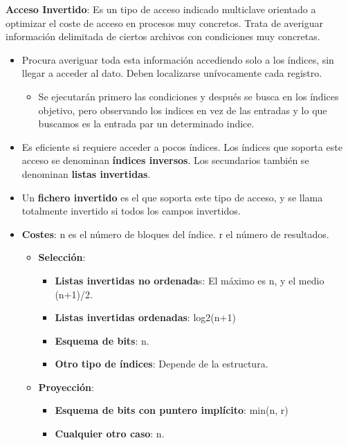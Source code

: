 \documentclass[12pt, twoside, openright]{report} %
\begin{document}
  \pagebreak
  \textbf{Acceso Invertido}: Es un tipo de acceso indicado multiclave
  orientado a optimizar el coste de acceso en procesos muy concretos.
  Trata de averiguar información delimitada de ciertos archivos con
  condiciones muy concretas.
  

  \begin{itemize}
  \item Procura averiguar toda esta información accediendo solo a los
    índices, sin llegar a acceder al dato. Deben localizarse
    unívocamente cada registro.
    

    \begin{itemize}
    \item Se ejecutarán primero las condiciones y después se busca en los
      índices objetivo, pero observando los indices en vez de las
      entradas y lo que buscamos es la entrada par un determinado
      indice.
      
    \end{itemize}
  \item Es eficiente si requiere acceder a pocos índices. Los índices que
    soporta este acceso se denominan \textbf{índices inversos}. Los
    secundarios también se denominan \textbf{listas invertidas}.
    
  \item Un \textbf{fichero invertido} es el que soporta este tipo de acceso,
    y se llama totalmente invertido si todos los campos invertidos.
    
  \item \textbf{Costes}: n es el número de bloques del índice. r el número
    de resultados.
    

    \begin{itemize}
    \item \textbf{Selección}:
      

      \begin{itemize}
      \item \textbf{Listas invertidas no ordenada}s: El máximo es n, y el
        medio (n+1)/2.
        
      \item \textbf{Listas invertidas ordenadas}: log2(n+1)
        
      \item \textbf{Esquema de bits}: n.
        
      \item \textbf{Otro tipo de índices}: Depende de la estructura.
        
      \end{itemize}
    \item \textbf{Proyección}:
      

      \begin{itemize}
      \item \textbf{Esquema de bits con puntero implícito}: min(n, r)
        
      \item \textbf{Cualquier otro caso}: n.
        
      \end{itemize}
    \end{itemize}
  \end{itemize}
\end{document}
